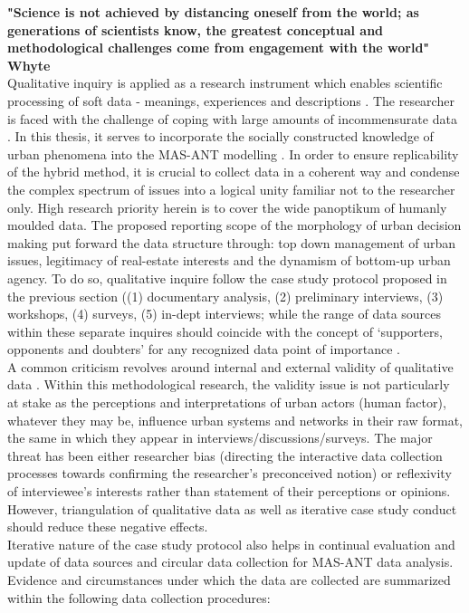 \documentclass[11pt]{report}
\begin{document}
\textbf{"Science is not achieved  by distancing oneself from  the world; as  generations of scientists  know,  the greatest conceptual and methodological challenges come from  engagement with the world" Whyte}
\\
Qualitative inquiry is applied as a research instrument which enables scientific processing of soft data - meanings, experiences and descriptions . The researcher is faced with the challenge of coping with large amounts of incommensurate data . In this thesis, it serves to incorporate the socially constructed knowledge of urban phenomena into the MAS-ANT modelling . In order to ensure replicability of the hybrid method, it is crucial to collect data in a coherent way and condense the complex spectrum of issues into a logical unity familiar not to the researcher only. High research priority herein is to cover the wide panoptikum of humanly moulded data. The proposed reporting scope of the morphology of urban decision making put forward the data structure through: top down management of urban issues, legitimacy of real-estate interests and the dynamism of bottom-up urban agency. To do so, qualitative inquire follow the case study protocol proposed in the previous section ((1) documentary analysis, (2) preliminary interviews, (3) workshops, (4) surveys, (5) in-dept interviews; while the range of data sources within these separate inquires should coincide with the concept of ‘supporters, opponents and doubters’ for any recognized data point of importance . 
\\
A common criticism revolves around internal and external validity of qualitative data . Within this methodological research, the validity issue is not particularly at stake as the perceptions and interpretations of urban actors (human factor), whatever they may be, influence urban systems and networks in their raw format, the same in which they appear in interviews/discussions/surveys. The major threat has been either researcher bias (directing the interactive data collection processes  towards confirming the researcher's preconceived notion) or reflexivity of interviewee's interests rather than statement of their perceptions or opinions. However, triangulation of qualitative data as well as iterative case study conduct should reduce these negative effects.
\\
Iterative nature of the case study protocol also helps in continual evaluation and update of data sources and circular data collection for MAS-ANT data analysis. Evidence and circumstances under which the data are collected are summarized within the following data collection procedures: 
\end{document}
